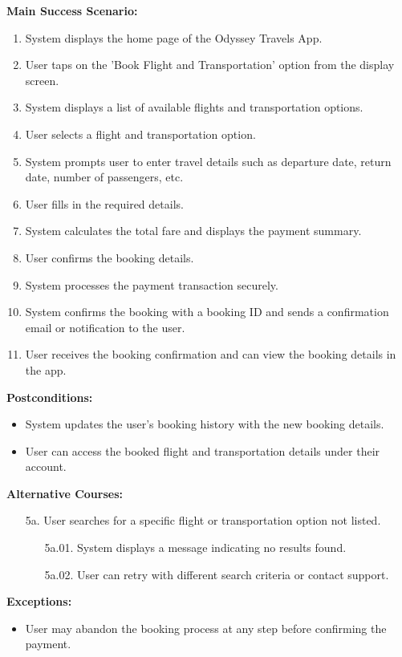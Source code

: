 \documentclass{scrreprt}
\begin{document}
\textbf{Main Success Scenario:}
\begin{enumerate}
    \item System displays the home page of the Odyssey Travels App.
    \item User taps on the 'Book Flight and Transportation' option from the display screen.
    \item System displays a list of available flights and transportation options.
    \item User selects a flight and transportation option.
    \item System prompts user to enter travel details such as departure date, return date, number of passengers, etc.
    \item User fills in the required details.
    \item System calculates the total fare and displays the payment summary.
    \item User confirms the booking details.
    \item System processes the payment transaction securely.
    \item System confirms the booking with a booking ID and sends a confirmation email or notification to the user.
    \item User receives the booking confirmation and can view the booking details in the app.
\end{enumerate}

\textbf{Postconditions:}
\begin{itemize}
    \item System updates the user's booking history with the new booking details.
    \item User can access the booked flight and transportation details under their account.
\end{itemize}

\textbf{Alternative Courses:}
\begin{itemize}
    \item[5a.] User searches for a specific flight or transportation option not listed.
    \begin{itemize}
        \item[5a.01.] System displays a message indicating no results found.
        \item[5a.02.] User can retry with different search criteria or contact support.
    \end{itemize}
\end{itemize}

\textbf{Exceptions:}
\begin{itemize}
    \item User may abandon the booking process at any step before confirming the payment.
\end{itemize}
\end{document}
